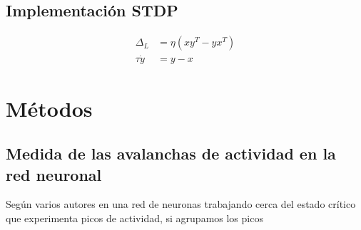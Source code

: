 \documentclass[11pt,a4paper,twoside,pdf]{article}
\begin{document}
\subsection{Implementación STDP}
\begin{align}
  \Delta_L &= \eta \left(xy^T - yx^T\right)\\
  \tau \dot{y} &= y - x
\end{align}

\section{Métodos}
\subsection{Medida de las avalanchas de actividad en la red neuronal}
\label{sec:medidas de las avalanchas}
Según varios autores \cite{beggs2003} en una red de neuronas trabajando cerca del estado crítico que experimenta picos de actividad, si agrupamos los picos 

\newpage



\end{document}
